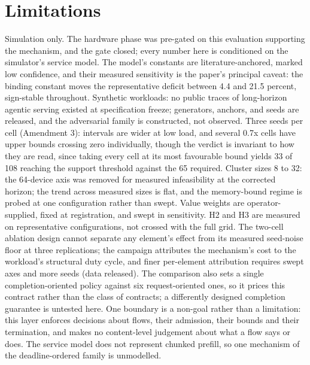 \section{Limitations}

Simulation only. The hardware phase was pre-gated on this evaluation
supporting the mechanism, and the gate closed; every number here is
conditioned on the simulator's service model. The model's constants are
literature-anchored, marked low confidence, and their measured
sensitivity is the paper's principal caveat: the binding constant moves
the representative deficit between 4.4 and 21.5 percent, sign-stable
throughout. Synthetic workloads: no public traces of long-horizon
agentic serving existed at specification freeze; generators, anchors,
and seeds are released, and the adversarial family is constructed, not
observed. Three seeds per cell (Amendment 3): intervals are wider at low
load, and several 0.7x cells have upper bounds crossing zero
individually, though the verdict is invariant to how they are read,
since taking every cell at its most favourable bound yields 33 of 108
reaching the support threshold against the 65 required. Cluster sizes 8
to 32: the 64-device axis was removed for measured infeasibility at the
corrected horizon; the trend across measured sizes is flat, and the
memory-bound regime is probed at one configuration rather than swept.
Value weights are operator-supplied, fixed at registration, and swept in
sensitivity. H2 and H3 are measured on representative configurations,
not crossed with the full grid. The two-cell ablation design cannot
separate any element's effect from its measured seed-noise floor at
three replications; the campaign attributes the mechanism's cost to the
workload's structural duty cycle, and finer per-element attribution
requires swept axes and more seeds (data released). The comparison also
sets a single completion-oriented policy against six request-oriented
ones, so it prices this contract rather than the class of contracts; a
differently designed completion guarantee is untested here. One boundary
is a non-goal rather than a limitation: this layer enforces decisions
about flows, their admission, their bounds and their termination, and
makes no content-level judgement about what a flow says or does. The
service model does not represent chunked prefill, so one mechanism of
the deadline-ordered family is unmodelled.

